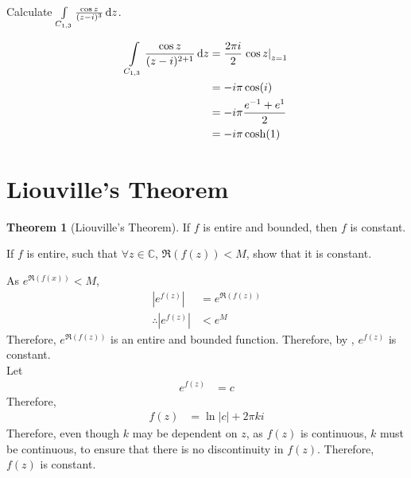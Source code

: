 \documentclass[titlepage, fleqn, a4paper, 12pt, twoside]{article}
\theoremstyle{definition}
\theoremstyle{theorem}
\newtheorem{theorem}{Theorem}
\begin{document}
\begin{question}
	Calculate $\int\limits_{C_{1,3}} \frac{\cos z}{(z - i)^3} \dif z$.
\end{question}

\begin{solution}
	\begin{align*}
		\int\limits_{C_{1,3}} \frac{\cos z}{(z - i)^{2 + 1}} \dif z & = \frac{2 \pi i}{2} \left. \cos z \right|_{z = 1} \\
                                                                            & = -i \pi \cos(i)                                  \\
                                                                            & = -i \pi \frac{e^{-1} + e^{1}}{2}                 \\
                                                                            & = -i \pi \cosh(1)
	\end{align*}
\end{solution}

\section{Liouville's Theorem}

\begin{theorem}[Liouville's Theorem]
	If $f$ is entire and bounded, then $f$ is constant.
	\label{thm:Liouville's_Theorem}
\end{theorem}

\begin{question}
	If $f$ is entire, such that $\forall z \in \mathbb{C}$, $\Re\left( f(z) \right) < M$, show that it is constant.
\end{question}

\begin{solution}
		As $e^{\Re\left( f(x) \right)} < M$,
		\begin{align*}
			\left| e^{f(z)} \right|            & = e^{\Re\left( f(z) \right)} \\
			\therefore \left| e^{f(z)} \right| & < e^M
		\end{align*}
		Therefore, $e^{\Re\left( f(z) \right)}$ is an entire and bounded function.
		Therefore, by , $e^{f(z)}$ is constant.\\
		Let
		\begin{align*}
			e^{f(z)} & = c
		\end{align*}
		Therefore,
		\begin{align*}
			f(z) & = \ln|c| + 2 \pi k i
		\end{align*}
		Therefore, even though $k$ may be dependent on $z$, as $f(z)$ is continuous, $k$ must be continuous, to ensure that there is no discontinuity in $f(z)$.
		Therefore, $f(z)$ is constant.
\end{solution}
\end{document}
